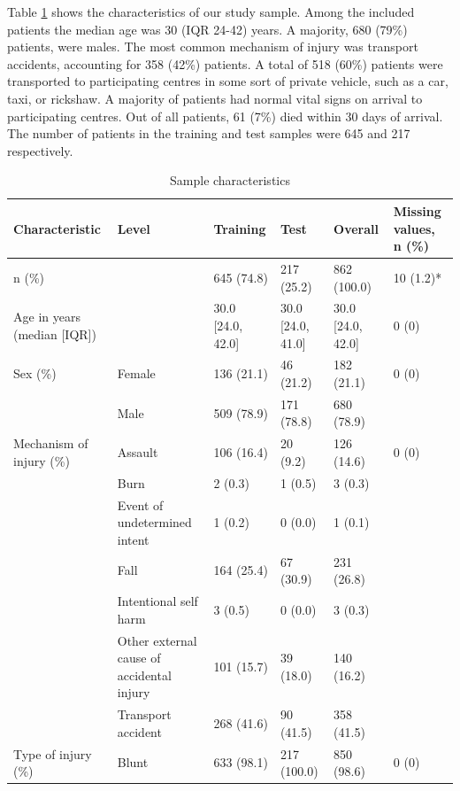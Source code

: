 \documentclass[10pt,letterpaper]{article}\usepackage[]{graphicx}\usepackage[]{color}
\begin{document}
Table \ref{tab:sample-characteristics} shows the characteristics of our study
sample. Among the included patients the median age was 30 (IQR 24-42)
years. A majority, 680 (79\%) patients, were males. The
most common mechanism of injury was transport accidents, accounting for
358 (42\%) patients. A total of
518 (60\%) patients were transported to
participating centres in some sort of private vehicle, such as a car, taxi, or
rickshaw. A majority of patients had normal vital signs on arrival to
participating centres. Out of all patients, 61 (7\%) died
within 30 days of arrival. The number of patients in the training and test
samples were 645 and 217
respectively.

\begin{table}[!ht] 
 \begin{adjustwidth}{-2.25in}{0in}
\centering
\caption{Sample characteristics} 
\label{tab:sample-characteristics}
\begin{adjustbox}{max width=\linewidth} 
\begin{tabular} 
{llllll}
  \hline
Characteristic & Level & Training & Test & Overall & Missing values, n (\%) \\ 
  \hline
n (\%) &  & 645 (74.8) & 217 (25.2) & 862 (100.0) & 10 (1.2)* \\ 
  Age in years (median [IQR]) &  & 30.0 [24.0, 42.0] & 30.0 [24.0, 41.0] & 30.0 [24.0, 42.0] & 0 (0) \\ 
  Sex (\%) & Female & 136 (21.1) & 46 (21.2) & 182 (21.1) & 0 (0) \\ 
   & Male & 509 (78.9) & 171 (78.8) & 680 (78.9) &  \\ 
  Mechanism of injury (\%) & Assault & 106 (16.4) & 20 (9.2) & 126 (14.6) & 0 (0) \\ 
   & Burn & 2 (0.3) & 1 (0.5) & 3 (0.3) &  \\ 
   & Event of undetermined intent & 1 (0.2) & 0 (0.0) & 1 (0.1) &  \\ 
   & Fall & 164 (25.4) & 67 (30.9) & 231 (26.8) &  \\ 
   & Intentional self harm & 3 (0.5) & 0 (0.0) & 3 (0.3) &  \\ 
   & Other external cause of accidental injury & 101 (15.7) & 39 (18.0) & 140 (16.2) &  \\ 
   & Transport accident & 268 (41.6) & 90 (41.5) & 358 (41.5) &  \\ 
  Type of injury (\%) & Blunt & 633 (98.1) & 217 (100.0) & 850 (98.6) & 0 (0) \\ 

\end{tabular}
\end{adjustbox}
\end{adjustwidth}
\end{table}
\end{document}
